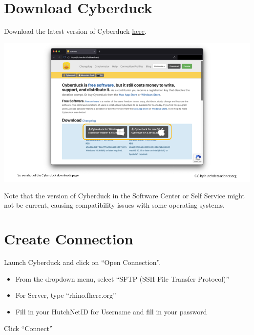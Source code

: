 \documentclass[
]{book}
\providecommand{\tightlist}{%
  \setlength{\itemsep}{0pt}\setlength{\parskip}{0pt}}
\begin{document}
\hypertarget{download-cyberduck}{%
\section{Download Cyberduck}\label{download-cyberduck}}

Download the latest version of Cyberduck \href{https://cyberduck.io/download/}{here}.

\begin{center}\includegraphics[width=1\linewidth]{resources/images/06-upload-download_files/figure-latex//1BQxrVYdKZTbpCaF-i_q9w7s9x034lEXpQZDU-Sl09cs_g16e400fe3e8_0_0} \end{center}

Note that the version of Cyberduck in the Software Center or Self Service might not be current, causing compatibility issues with some operating systems.

\hypertarget{create-connection}{%
\section{Create Connection}\label{create-connection}}

Launch Cyberduck and click on ``Open Connection''.

\begin{itemize}
\tightlist
\item
  From the dropdown menu, select ``SFTP (SSH File Transfer Protocol)''
\item
  For Server, type ``rhino.fhcrc.org''
\item
  Fill in your HutchNetID for Username and fill in your password
\end{itemize}

Click ``Connect''
\end{document}
